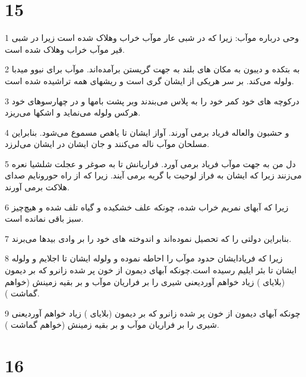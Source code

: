 \chapter{15}

\par 1 وحی درباره موآب: زیرا که در شبی عار موآب خراب وهلاک شده است زیرا در شبی قیر موآب خراب وهلاک شده است.
\par 2 به بتکده و دیبون به مکان های بلند به جهت گریستن برآمده‌اند. موآب برای نبوو میدبا ولوله می‌کند. بر سر هریکی از ایشان گری است و ریشهای همه تراشیده شده است.
\par 3 درکوچه های خود کمر خود را به پلاس می‌بندند وبر پشت بامها و در چهارسوهای خود هرکس ولوله می‌نماید و اشکها می‌ریزد.
\par 4 و حشبون والعاله فریاد برمی آورند. آواز ایشان تا یاهص مسموع می‌شود. بنابراین مسلحان موآب ناله می‌کنند و جان ایشان در ایشان می‌لرزد.
\par 5 دل من به جهت موآب فریاد برمی آورد. فراریانش تا به صوغر و عجلت شلشیا نعره می‌زنند زیرا که ایشان به فراز لوحیت با گریه برمی آیند. زیرا که از راه حورونایم صدای هلاکت برمی آورند.
\par 6 زیرا که آبهای نمریم خراب شده، چونکه علف خشکیده و گیاه تلف شده و هیچ‌چیز سبز باقی نمانده است.
\par 7 بنابراین دولتی را که تحصیل نموده‌اند و اندوخته های خود را بر وادی بیدها می‌برند.
\par 8 زیرا که فریادایشان حدود موآب را احاطه نموده و ولوله ایشان تا اجلایم و ولوله ایشان تا بئر ایلیم رسیده است.چونکه آبهای دیمون از خون پر شده زانرو که بر دیمون (بلایای ) زیاد خواهم آوردیعنی شیری را بر فراریان موآب و بر بقیه زمینش (خواهم گماشت ).
\par 9 چونکه آبهای دیمون از خون پر شده زانرو که بر دیمون (بلایای ) زیاد خواهم آوردیعنی شیری را بر فراریان موآب و بر بقیه زمینش (خواهم گماشت ).
 
\chapter{16}

